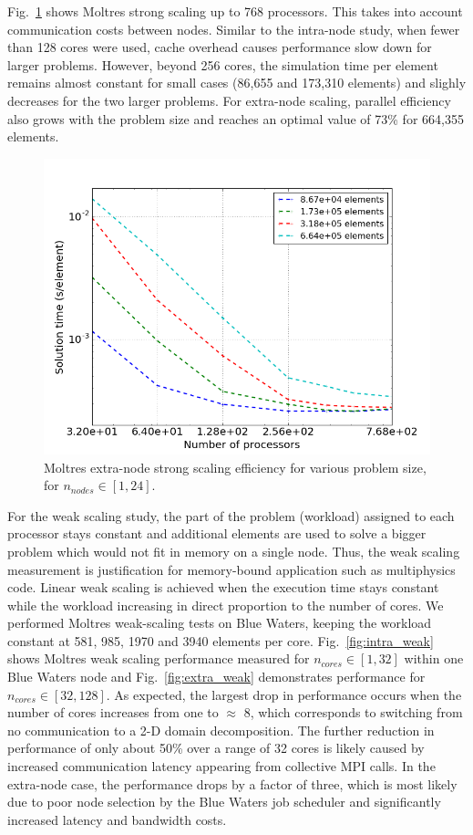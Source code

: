 \documentclass{anstrans}
\begin{document}
Fig.~\ref{fig:extra_strong_scaling} shows Moltres strong scaling up to 768
processors. This takes into account communication costs between nodes.
Similar to the intra-node study, when fewer than 128 cores were used,
cache overhead causes performance slow down for larger problems. However,
beyond 256 cores, the simulation time per element remains almost constant
for small cases (86,655 and 173,310 elements) and slighly decreases for the
two larger problems. For extra-node scaling, parallel efficiency also grows
with the problem size and reaches an optimal value of 73\% for 664,355 elements.

\begin{figure}[htpb]
  \centering
  \includegraphics[width=1\linewidth]{extra-node_strong.png}
  \caption{Moltres extra-node strong scaling efficiency for various problem size, for $n_{nodes} \in [1,24]$.}
  \label{fig:extra_strong_scaling}
\end{figure}

For the weak scaling study, the part of the problem (workload) assigned
to each processor stays constant and additional elements are used to
solve a bigger problem which would not fit in memory on a single node.
Thus, the weak scaling measurement is justification for memory-bound
application such as multiphysics code. Linear weak scaling is achieved
when the execution time stays constant while the workload increasing
in direct proportion to the number of cores. We performed Moltres
weak-scaling tests on Blue Waters, keeping the workload constant at
581, 985, 1970 and 3940 elements per core. Fig.~\ref{fig:intra_weak} shows
Moltres weak scaling performance measured for $n_{cores} \in [1,32]$ within
one Blue Waters node and Fig.~\ref{fig:extra_weak} demonstrates performance
for $n_{cores} \in [32,128]$. As expected, the largest drop in performance
occurs when the number of cores increases from one to $\approx$ 8, which
corresponds to switching from no communication to a 2-D domain
decomposition. The further reduction in performance of only about 50\%
over a range of 32 cores is likely caused by increased communication
latency appearing from collective \gls{MPI} calls. In the extra-node case,
the performance drops by a factor of three, which is most likely due to poor node
selection by the Blue Waters job scheduler and significantly increased latency and
bandwidth costs.
\end{document}
